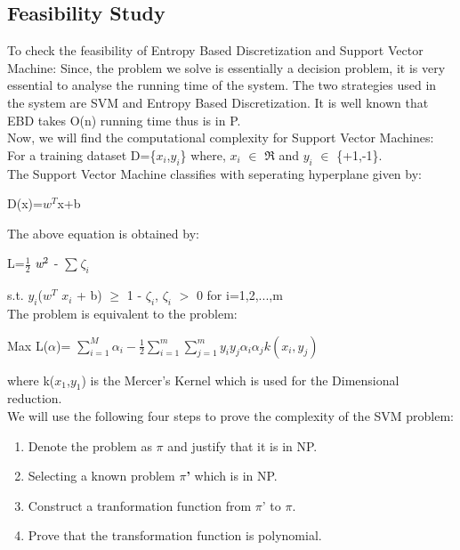 \documentclass[12pt,a4paper,final]{report}
\DeclareRobustCommand{\gobblefive}[5]{}
\newcommand*{\SkipTocEntry}{\addtocontents{toc}{\gobblefive}}
\begin{document}
\SkipTocEntry\subsection{Feasibility Study}
To check the feasibility of Entropy Based Discretization and Support Vector Machine:
\newline Since, the problem we solve is essentially a decision problem, it is very essential to analyse the running time of the system. The two strategies used in the system are SVM and Entropy Based Discretization. It is well known that EBD takes O(n) running time thus is in P.\\
\newline
Now, we will find the computational complexity for Support Vector Machines:\\
For a training dataset D=\{$x_i$,$y_i$\} where, $x_i$ $\in$ $\Re$ and $y_i$ $\in$ \{+1,-1\}.\\
The Support Vector Machine classifies with seperating hyperplane given by:\\
\begin{center}
D(x)=$w^T$x+b
\end{center}
The above equation is obtained by:\\
\begin{center}
L=$\frac{1}{2}$ $\emph{w}^2$ - $\sum_{}^{} \zeta_i$ \\
\end{center}
s.t. $y_i$($w^T$ $x_i$ + b) $\geq$ 1 - $\zeta_i$, $\zeta_i$ $>$ 0 for i=1,2,...,m \\
\newline The problem is equivalent to the problem:\\
\begin{center}
Max L($\alpha$)= $\sum_{i=1}^{M} \alpha_i - \frac{1}{2} \sum_{i=1}^{m}\sum_{j=1}^{m} y_iy_j\alpha_i\alpha_jk(x_i,y_j)$ \\

\end{center}
where k($x_1$,$y_1$) is the Mercer's Kernel which is used for the 
Dimensional reduction.\\
\newline We will use the following four steps to prove the complexity of the SVM problem:
\begin{enumerate}
\item
Denote the problem as \textbf{$\pi$} and justify that it is in NP.
\item
Selecting a known problem \textbf{$\pi$'} which is in NP.
\item
Construct a tranformation function from $\pi$' to $\pi$.
\item
Prove that the transformation function is polynomial.
\end{enumerate}
\end{document}
